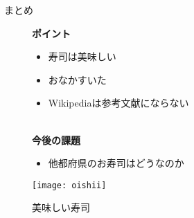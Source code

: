 \begin{frame}[fragile,c]{まとめ}
    \setlength{\leftmargini}{1em}

    \begin{figure}[H]
        \begin{minipage}[b]{0.55\hsize}
            \textbf{ポイント}
            \begin{itemize}
                \item 寿司は\alert{美味しい}
                \item おなかすいた
                \item Wikipediaは参考文献にならない
            \end{itemize}
            　\\
            \textbf{今後の課題}
            \begin{itemize}
                \item 他都府県のお寿司はどうなのか
            \end{itemize}
        \end{minipage}
        \begin{minipage}[t]{0.4\hsize}
            \centering
            \texttt{[image: oishii]}
            \caption{美味しい寿司}
            \label{fig:oishii}
        \end{minipage}
    \end{figure}

\end{frame}
